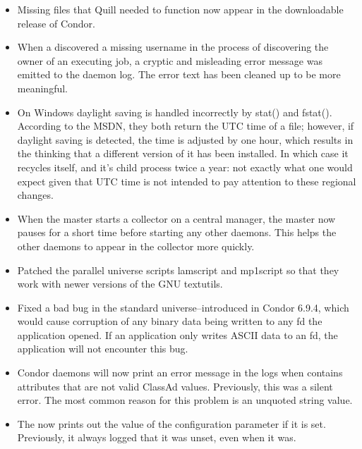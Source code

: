 \begin{itemize}

\item Missing files that Quill needed to function now appear in the
downloadable release of Condor.

\item When a  discovered a missing username in the
process of discovering the owner of an executing job, a cryptic and
misleading error message was emitted to the daemon log. The error text
has been cleaned up to be more meaningful.

\item On Windows daylight saving is handled incorrectly by stat() and fstat().
      According to the MSDN, they both return the UTC time of a file; however,
      if daylight saving is detected, the time is adjusted by one hour, which 
      results in the  thinking that a different version of it 
      has been installed.  In which case it recycles itself, and it's child 
      process twice a year: not exactly what one would expect given that UTC
      time is not intended to pay attention to these regional changes.

\item When the master starts a collector on a central manager, the master
	now pauses for a short time before starting any other daemons. This
	helps the other daemons to appear in the collector more quickly. 

\item Patched the parallel universe scripts lamscript and mp1script
so that they work with newer versions of the GNU textutils.

\item Fixed a bad bug in the standard universe--introduced in Condor
6.9.4,  which would cause corruption of any binary data being written to
any fd the application opened. If an application only writes ASCII data
to an fd, the application will not encounter this bug.

\item Condor daemons will now print an error message in the logs when
 contains attributes that are not valid
ClassAd values.  Previously, this was a silent error.  The most common
reason for this problem is an unquoted string value.

\item The  now prints out the value of the configuration
	parameter  if it is set.  Previously,
	it always logged that it was unset, even when it was.


\end{itemize}
